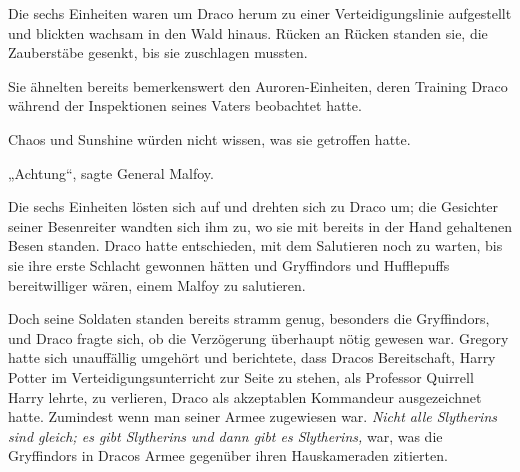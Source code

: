 Die sechs Einheiten waren um Draco herum zu einer Verteidigungslinie aufgestellt und blickten wachsam in den Wald hinaus. Rücken an Rücken standen sie, die Zauberstäbe gesenkt, bis sie zuschlagen mussten.

Sie ähnelten bereits bemerkenswert den Auroren-Einheiten, deren Training Draco während der Inspektionen seines Vaters beobachtet hatte.

Chaos und Sunshine würden nicht wissen, was sie getroffen hatte.

„Achtung“, sagte General Malfoy.

Die sechs Einheiten lösten sich auf und drehten sich zu Draco um; die Gesichter seiner Besenreiter wandten sich ihm zu, wo sie mit bereits in der Hand gehaltenen Besen standen.
Draco hatte entschieden, mit dem Salutieren noch zu warten, bis sie ihre erste Schlacht gewonnen hätten und Gryffindors und Hufflepuffs bereitwilliger wären, einem Malfoy zu salutieren.

Doch seine Soldaten standen bereits stramm genug, besonders die Gryffindors, und Draco fragte sich, ob die Verzögerung überhaupt nötig gewesen war. Gregory hatte sich unauffällig umgehört und berichtete, dass Dracos Bereitschaft, Harry Potter im Verteidigungsunterricht zur Seite zu stehen, als Professor Quirrell Harry lehrte, zu verlieren, Draco als akzeptablen Kommandeur ausgezeichnet hatte. Zumindest wenn man seiner Armee zugewiesen war. \emph{Nicht alle Slytherins sind gleich; es gibt Slytherins und dann gibt es Slytherins,} war, was die Gryffindors in Dracos Armee gegenüber ihren Hauskameraden zitierten.

